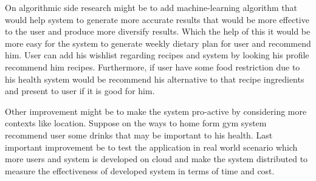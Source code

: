 On algorithmic side research might be to add machine-learning algorithm that would help system to generate more accurate results that would be more effective to the user and produce more diversify results. Which the help of this it would be more easy for the system to generate weekly dietary plan for user and recommend him. User can add his wishlist regarding recipes and system by looking his profile recommend him recipes. Furthermore, if user have some food restriction due to his health system would be recommend his alternative to that recipe ingredients and present to user if it is good for him.\newline

Other improvement might be to make the system pro-active by considering more contexts like location. Suppose on the ways to home form gym system recommend user some drinks that may be important to his health. Last important improvement be to test the application in real world scenario which more users and system is developed on cloud and make the system distributed to measure the effectiveness of developed system in terms of time and cost. 